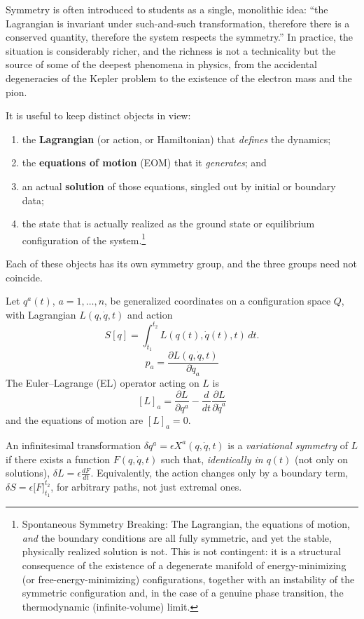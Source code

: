 Symmetry is often introduced to students as a single, monolithic idea: ``the
Lagrangian is invariant under such-and-such transformation, therefore there is
a conserved quantity, therefore the system respects the symmetry.'' In
practice, the situation is considerably richer, and the richness is not a
technicality but the source of some of the deepest phenomena in physics, from
the accidental degeneracies of the Kepler problem to the existence of the
electron mass and the pion.

It is useful to keep distinct objects in view:
\begin{enumerate}
\item the \textbf{Lagrangian} (or action, or Hamiltonian) that \emph{defines} 
    the dynamics;
\item the \textbf{equations of motion} (EOM) that it \emph{generates}; and
\item an actual \textbf{solution} of those equations, singled out by initial
    or boundary data;
\item the state that is actually realized as the ground state or equilibrium 
    configuration of the system.\footnote { Spontaneous Symmetry Breaking: 
        The Lagrangian, the equations of motion,
        \emph{and} the boundary conditions are all fully symmetric, and yet the
        stable, physically realized solution is not. This is not contingent: it
        is a structural consequence of the existence of a degenerate manifold
        of energy-minimizing (or free-energy-minimizing) configurations,
        together with an instability of the symmetric configuration and, in the
        case of a genuine phase transition, the thermodynamic (infinite-volume)
        limit.}

\end{enumerate}
Each of these objects has its own symmetry group, and the three groups need not
coincide. 

Let $q^a(t)$, $a=1,\dots,n$, be generalized coordinates on a 
configuration
space $Q$, with Lagrangian $L(q,\dot q,t)$ and action
\[
S[q] = \int_{t_1}^{t_2} L(q(t),\dot q(t),t)\,dt .
\]
\begin{equation*}
   p_a=\frac{ \partial L(q,\dot q,t)}{\partial \dot q_a}
\end{equation*}
The Euler--Lagrange (EL) operator acting on $L$ is
\[
[L]_a = \frac{\partial L}{\partial q^a} - 
\frac{d}{dt}\frac{\partial L}{\partial \dot q^a}
\]
and the equations of motion are $[L]_a=0$.

\begin{definition}
An infinitesimal transformation $\delta q^a = \epsilon X^a(q,\dot q,t)$ is a
    \emph{variational symmetry} of $L$ if there exists a function $F(q,\dot
    q,t)$ such that, \emph{identically in $q(t)$} (not only on solutions),
    $\delta L=\epsilon \tfrac{dF}{dt}$. Equivalently, the action changes only by
    a boundary term, $\delta S = \epsilon\big[F\big]_{t_1}^{t_2}$, for
    arbitrary paths, not just extremal ones.
\end{definition}

